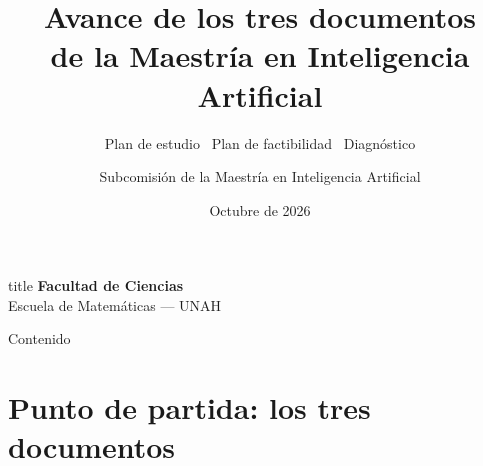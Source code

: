 \documentclass[10pt,aspectratio=169]{beamer}
\title{Avance de los tres documentos\\
       de la Maestría en Inteligencia Artificial}
\subtitle{Plan de estudio \textbullet\ Plan de factibilidad \textbullet\ Diagnóstico}
\institute{Universidad Nacional Autónoma de Honduras}
\author{Subcomisión de la Maestría en Inteligencia Artificial}
\date{Octubre de 2026}
\begin{document}
{
\begin{frame}[plain]
  \titlepage
  \vspace{1.2cm}
  \begin{center}
    \begin{beamercolorbox}[wd=0.86\textwidth,sep=1.0ex,rounded=true]{title}
      \centering\small
      \textbf{Facultad de Ciencias}\\[0.2ex]
      {\footnotesize Escuela de Matemáticas --- UNAH}
    \end{beamercolorbox}
  \end{center}
\end{frame}}

\begin{frame}{Contenido}
  \tableofcontents
\end{frame}

\section*{Punto de partida: los tres documentos}
\end{document}
